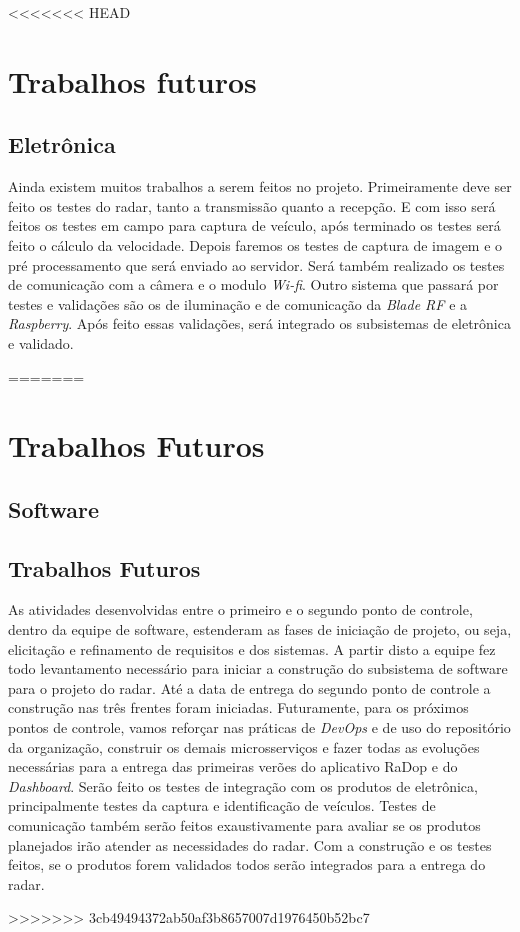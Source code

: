 <<<<<<< HEAD
\chapter{Trabalhos futuros}

\section{Eletrônica}

Ainda existem muitos trabalhos a serem feitos no projeto. Primeiramente deve ser feito os testes do radar, tanto a transmissão quanto a recepção. E com isso será feitos os testes em campo para captura de veículo, após terminado os testes será feito o cálculo da velocidade. Depois faremos os testes de captura de imagem e o pré processamento que será enviado ao servidor. Será também realizado os testes de comunicação com a câmera e o modulo \emph{Wi-fi}. Outro sistema que passará por testes e validações são os de iluminação e de comunicação da \emph{Blade RF} e a \emph{Raspberry}. Após feito essas validações, será integrado os subsistemas de eletrônica e validado.


=======
\chapter{Trabalhos Futuros} %
\label{cha:trabalhos-futuros}

\section{Software}

\section{Trabalhos Futuros}

As atividades desenvolvidas entre o primeiro e o segundo ponto de controle, dentro da equipe de software, estenderam as fases de iniciação de projeto, ou seja, elicitação e refinamento de requisitos e dos sistemas. A partir disto a equipe fez todo levantamento necessário para iniciar a construção do subsistema de software para o projeto do radar. Até a data de entrega do segundo ponto de controle a construção nas três frentes foram iniciadas. Futuramente, para os próximos pontos de controle, vamos reforçar nas práticas de \textit{DevOps} e de uso do repositório da organização, construir os demais microsserviços e fazer todas as evoluções necessárias para a entrega das primeiras verões do aplicativo RaDop e do \textit{Dashboard}. Serão feito os testes de integração com os produtos de eletrônica, principalmente testes da captura e identificação de veículos. Testes de comunicação também serão feitos exaustivamente para avaliar se os produtos planejados irão atender as necessidades do radar. Com a construção e os testes feitos, se o produtos forem validados todos serão integrados para a entrega do radar.

>>>>>>> 3cb49494372ab50af3b8657007d1976450b52bc7
